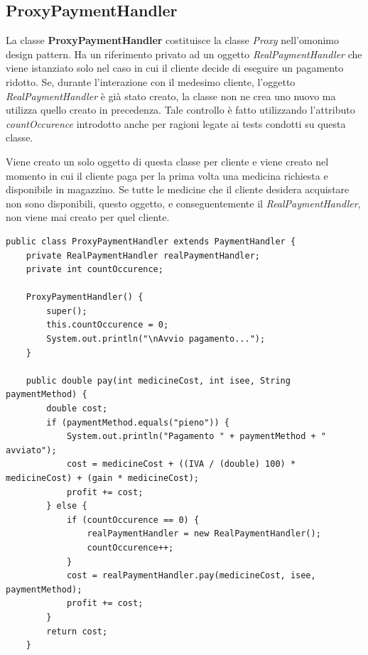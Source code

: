 \documentclass[a4paper, 10pt]{report}
\begin{document}
\subsection{ProxyPaymentHandler}
La classe \textbf{ProxyPaymentHandler} costituisce la classe \textit{Proxy} nell'omonimo design pattern. Ha un riferimento privato ad un oggetto \textit{RealPaymentHandler} che viene istanziato solo nel caso in cui il cliente decide di eseguire un pagamento ridotto. Se, durante l'interazione con il medesimo cliente, l'oggetto \textit{RealPaymentHandler}  è già stato creato, la classe non ne crea uno nuovo ma utilizza quello creato in precedenza. Tale controllo è fatto utilizzando l'attributo \textit{countOccurence} introdotto anche per ragioni legate ai tests condotti su questa classe.

Viene creato un solo oggetto di questa classe per cliente e viene creato nel momento in cui il cliente paga per la prima volta una medicina richiesta e disponibile in magazzino. Se tutte le medicine che il cliente desidera acquistare non sono disponibili, questo oggetto, e conseguentemente il \textit{RealPaymentHandler}, non viene mai creato per quel cliente.\\
\begin{lstlisting}
public class ProxyPaymentHandler extends PaymentHandler {
    private RealPaymentHandler realPaymentHandler;
    private int countOccurence;

    ProxyPaymentHandler() {
        super();
        this.countOccurence = 0;
        System.out.println("\nAvvio pagamento...");
    }

    public double pay(int medicineCost, int isee, String paymentMethod) {
        double cost;
        if (paymentMethod.equals("pieno")) {
            System.out.println("Pagamento " + paymentMethod + " avviato");
            cost = medicineCost + ((IVA / (double) 100) * medicineCost) + (gain * medicineCost);
            profit += cost;
        } else {
            if (countOccurence == 0) {
                realPaymentHandler = new RealPaymentHandler();
                countOccurence++;
            }
            cost = realPaymentHandler.pay(medicineCost, isee, paymentMethod);
            profit += cost;
        }
        return cost;
    }
\end{lstlisting}
\end{document}
